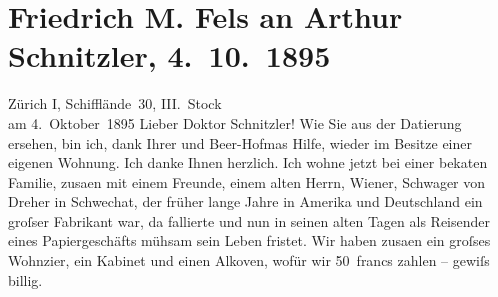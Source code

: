 

               \section[Friedrich M. Fels an Arthur Schnitzler, 4. 10. 1895]{ Friedrich M. Fels an Arthur Schnitzler, 4. 10. 1895}\nopagebreak{}\rehead{ }\begin{ledgroupsized}[t]{13cm}\normalsize\beginnumbering{} \toendnotes[C]{\smallbreak\pagebreak[2]} 
\toendnotes[C]{\smallbreak}\pstart
           \raggedleft{}{\pb}Zürich I, Schifflände 30,
                        III. Stock{\\}am 4. Oktober 1895\pend
           \pstart\center{}Lieber Doktor Schnitzler!\pend\pstart
           Wie Sie aus der Datierung ersehen, bin ich, dank Ihrer und Beer-Hofma{\geminationn}s Hilfe, wieder im Besitze einer eigenen Wohnung. Ich danke Ihnen herzlich.
                    Ich wohne jetzt bei einer beka{\geminationn}ten Familie, zusa{\geminationm}en mit einem Freunde, einem alten Herrn, Wiener, Schwager von Dreher in Schwechat, der früher
                    lange Jahre in Amerika und Deutschland ein groſser Fabrikant war, da{\geminationn} fallierte und nun in seinen alten Tagen als
                    Reisender eines Papiergeschäfts mühsam sein Leben fristet. Wir haben zusa{\geminationm}en ein groſses Wohnzi{\geminationm}er, ein Kabinet und einen Alkoven, wofür wir 50 francs zahlen – gewiſs billig.

\end{ledgroupsized}
